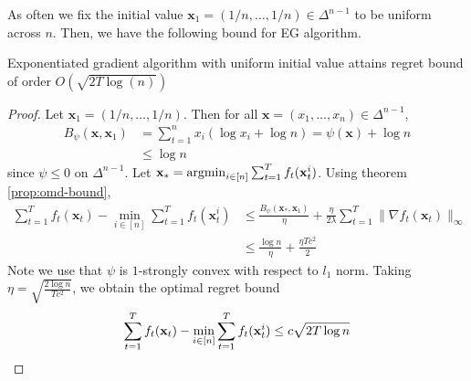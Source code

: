 \documentclass[12pt, a4paper]{report}
\begin{document}
As often we fix the initial value $\mathbf{x}_1 = (1/n, \dots, 1/n) \in \Delta^{n-1}$ to be uniform across $n$. Then, we have the following bound for EG algorithm.
\begin{prop}\label{prop:eg-bound}
Exponentiated gradient algorithm with uniform initial value attains regret bound of order $O(\sqrt{2T \log(n)})$
\end{prop}
\begin{proof}
Let $\mathbf{x}_1 = (1/n, \dots, 1/n)$. Then for all $\mathbf{x} = (x_1, \dots, x_n) \in \Delta^{n-1}$,
\begin{align*}
    B_\psi(\mathbf{x}, \mathbf{x}_1) &= \sum_{t=1}^n x_i (\log x_i + \log n) = \psi(\mathbf{x}) + \log n
    \\
    &\leq \log n
\end{align*}
since $\psi \leq 0$ on $\Delta^{n-1}$.
Let $\mathbf{x}_* = \operatorname*{argmin}_{i \in [n]} \sum_{t=1}^T f_t(\mathbf{x}_t^i)$.
Using theorem \ref{prop:omd-bound},
\begin{align*}
    \sum_{t=1}^T f_t(\mathbf{x}_t) - \min_{i \in [n]} \sum_{t=1}^T f_t(\mathbf{x}_t^i) &\leq \frac{B_\psi(\mathbf{x}_*, \mathbf{x}_1)}{\eta} + \frac{\eta}{2\lambda} \sum_{t=1}^T \lVert \nabla f_t(\mathbf{x}_t) \rVert_{\infty} 
    \\
    &\leq \frac{\log n}{\eta} + \frac{\eta Tc^2}{2}
\end{align*}
Note we use that $\psi$ is $1$-strongly convex with respect to $l_1$ norm. Taking $\eta = \sqrt{\frac{2 \log n}{Tc^2}}$, we obtain the optimal regret bound
\begin{equation*}
    \sum_{t=1}^T f_t(\mathbf{x}_t) - \min_{i \in [n]} \sum_{t=1}^T f_t(\mathbf{x}_t^i) \leq c\sqrt{2T\log n}  \qedhere
\end{equation*}
\end{proof}
\end{document}
